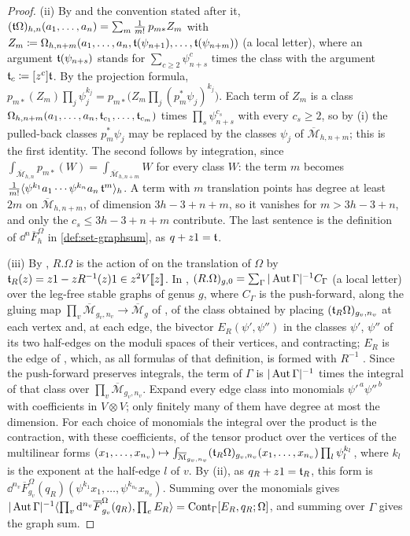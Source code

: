 \begin{proof}
(ii) By \cite[Def.~2.5]{PPZ15} and the convention stated after it, $(\mathfrak{t}\Omega)_{h,n}(a_1,\dots,a_n)=\sum_m\frac1{m!}\,p_{m*}Z_m$ with $Z_m\coloneqq\Omega_{h,n+m}(a_1,\dots,a_n,\mathfrak{t}(\psi_{n+1}),\dots,\mathfrak{t}(\psi_{n+m}))$ (a local letter), where an argument $\mathfrak{t}(\psi_{n+s})$ stands for $\sum_{c\geq2}\psi_{n+s}^c$ times the class with the argument $\mathfrak{t}_c\coloneqq[z^c]\mathfrak{t}$. By the projection formula, $p_{m*}(Z_m)\prod_j\psi_j^{k_j}=p_{m*}\bigl(Z_m\prod_j(p_m^*\psi_j)^{k_j}\bigr)$. Each term of $Z_m$ is a class $\Omega_{h,n+m}(a_1,\dots,a_n,\mathfrak{t}_{c_1},\dots,\mathfrak{t}_{c_m})$ times $\prod_s\psi_{n+s}^{c_s}$ with every $c_s\geq2$, so by (i) the pulled-back classes $p_m^*\psi_j$ may be replaced by the classes $\psi_j$ of $\overline{\mathcal M}_{h,n+m}$; this is the first identity. The second follows by integration, since $\int_{\overline{\mathcal M}_{h,n}}p_{m*}(W)=\int_{\overline{\mathcal M}_{h,n+m}}W$ for every class $W$: the term $m$ becomes $\frac1{m!}\langle\psi^{k_1}a_1\cdots\psi^{k_n}a_n\,\mathfrak{t}^m\rangle_h$. A term with $m$ translation points has degree at least $2m$ on $\overline{\mathcal M}_{h,n+m}$, of dimension $3h-3+n+m$, so it vanishes for $m>3h-3+n$, and only the $c_s\leq3h-3+n+m$ contribute. The last sentence is the definition of $\dd^n\overline F^\Omega_h$ in \cref{def:set-graphsum}, as $q+z1=\mathfrak{t}$.

(iii) By \cite[Def.~2.13]{PPZ15}, $R.\Omega$ is the action of \cite[Def.~2.2]{PPZ15} on the translation of $\Omega$ by $\mathfrak{t}_R(z)=z1-zR^{-1}(z)1\in z^2V[\![ z ]\!]$. In \cite[Def.~2.2]{PPZ15}, $(R.\Omega)_{g,0}=\sum_\Gamma|\operatorname{Aut}\Gamma|^{-1}C_\Gamma$ (a local letter) over the leg-free stable graphs of genus $g$, where $C_\Gamma$ is the push-forward, along the gluing map $\prod_v\overline{\mathcal M}_{g_v,n_v}\to\overline{\mathcal M}_g$ of \cite[\S0.2, (1)]{PPZ15}, of the class obtained by placing $(\mathfrak{t}_R\Omega)_{g_v,n_v}$ at each vertex and, at each edge, the bivector $E_R(\psi',\psi'')$ in the classes $\psi'$, $\psi''$ of its two half-edges on the moduli spaces of their vertices, and contracting; $E_R$ is the edge of \cite[Def.~2.2~(iii)]{PPZ15}, which, as all formulas of that definition, is formed with $R^{-1}$ \cite[p.~20]{PPZ15}. Since the push-forward preserves integrals, the term of $\Gamma$ is $|\operatorname{Aut}\Gamma|^{-1}$ times the integral of that class over $\prod_v\overline{\mathcal M}_{g_v,n_v}$. Expand every edge class into monomials $\psi'^{\,a}\psi''^{\,b}$ with coefficients in $V\otimes V$; only finitely many of them have degree at most the dimension. For each choice of monomials the integral over the product is the contraction, with these coefficients, of the tensor product over the vertices of the multilinear forms $(x_1,\dots,x_{n_v})\mapsto\int_{\overline{\mathcal M}_{g_v,n_v}}(\mathfrak{t}_R\Omega)_{g_v,n_v}(x_1,\dots,x_{n_v})\prod_l\psi_l^{k_l}$, where $k_l$ is the exponent at the half-edge $l$ of $v$. By (ii), as $q_R+z1=\mathfrak{t}_R$, this form is $\dd^{n_v}\overline F^\Omega_{g_v}(q_R)(\psi^{k_1}x_1,\dots,\psi^{k_{n_v}}x_{n_v})$. Summing over the monomials gives $|\operatorname{Aut}\Gamma|^{-1}\langle\prod_v\mathrm{d}^{n_v}\overline F^\Omega_{g_v}(q_R),\prod_eE_R\rangle=\mathrm{Cont}_\Gamma[E_R,q_R;\Omega]$, and summing over $\Gamma$ gives the graph sum.
\end{proof}


